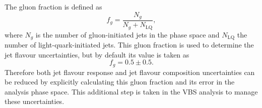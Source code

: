 The gluon fraction is defined as
\begin{equation*}
  f_g = \frac{N_g}{N_g + N_\text{LQ}},
\end{equation*}
where $N_g$ is the number of gluon-initiated jets in the phase space and
$N_\text{LQ}$ the number of light-quark-initiated jets.
This gluon fraction is used to determine the jet flavour uncertainties, but by
default its value is taken as
\begin{equation*}
  f_g = 0.5 \pm 0.5.
\end{equation*}
Therefore both jet flavour response and jet flavour composition uncertainties
can be reduced by explicitly calculating this gluon fraction and its error in
the analysis phase space. This additional step is taken in the \ac{VBS} analysis
to manage these uncertainties.
